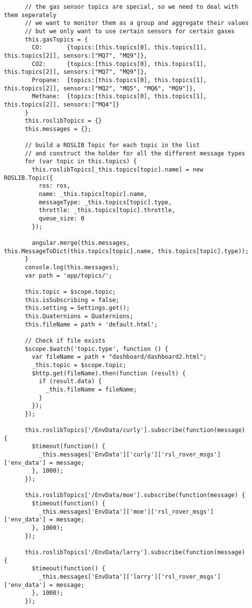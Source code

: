 \begin{verbatim}
      // the gas sensor topics are special, so we need to deal with them seperately
      // we want to monitor them as a group and aggregate their values
      // but we only want to use certain sensors for certain gases
      this.gasTopics = {
        CO:       {topics:[this.topics[0], this.topics[1], this.topics[2]], sensors:["MQ7", "MQ9"]},
        CO2:      {topics:[this.topics[0], this.topics[1], this.topics[2]], sensors:["MQ7", "MQ9"]},
        Propane:  {topics:[this.topics[0], this.topics[1], this.topics[2]], sensors:["MQ2", "MQ5", "MQ6", "MQ9"]},
        Methane:  {topics:[this.topics[0], this.topics[1], this.topics[2]], sensors:["MQ4"]}
      }
      this.roslibTopics = {}
      this.messages = {};

      // build a ROSLIB Topic for each topic in the list
      // and construct the holder for all the different message types
      for (var topic in this.topics) {
        this.roslibTopics[_this.topics[topic].name] = new ROSLIB.Topic({
          ros: ros,
          name: _this.topics[topic].name,
          messageType: _this.topics[topic].type,
          throttle: _this.topics[topic].throttle,
          queue_size: 0
        });

        angular.merge(this.messages, this.MessageToDict(this.topics[topic].name, this.topics[topic].type));
      }
      console.log(this.messages);
      var path = 'app/topics/';

      this.topic = $scope.topic;
      this.isSubscribing = false;
      this.setting = Settings.get();
      this.Quaternions = Quaternions;
      this.fileName = path + 'default.html';

      // Check if file exists
      $scope.$watch('topic.type', function () {
        var fileName = path + "dashboard/dashboard2.html";
        _this.topic = $scope.topic;
        $http.get(fileName).then(function (result) {
          if (result.data) {
            _this.fileName = fileName;
          }
        });
      });

      this.roslibTopics['/EnvData/curly'].subscribe(function(message) {
        $timeout(function() {
          _this.messages['EnvData']['curly']['rsl_rover_msgs']['env_data'] = message;
        }, 1000);
      });

      this.roslibTopics['/EnvData/moe'].subscribe(function(message) {
        $timeout(function() {
          _this.messages['EnvData']['moe']['rsl_rover_msgs']['env_data'] = message;
        }, 1000);
      });

      this.roslibTopics['/EnvData/larry'].subscribe(function(message) {
        $timeout(function() {
          _this.messages['EnvData']['larry']['rsl_rover_msgs']['env_data'] = message;
        }, 1000);
      });


\end{verbatim}
